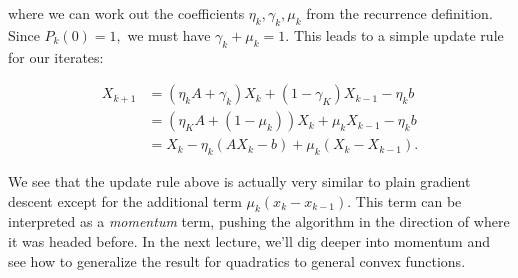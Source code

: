 where we can work out the coefficients $\eta_k,\gamma_k,\mu_k$ from the recurrence definition. Since $P_k(0)=1,$ we must have $\gamma_k+\mu_k=1.$ This leads to a simple update rule for our iterates:

\begin{eqnarray*}
X_{k+1} &= (\eta_k A + \gamma_k)X_k + (1 - \gamma_K)X_{k-1} - \eta_k b \\
&= (\eta_K A + (1 - \mu_k))X_k + \mu_k X_{k-1} - \eta_k b \\
&= X_k - \eta_k(AX_k - b) + \mu_k(X_k - X_{k-1}).
\end{eqnarray*}

We see that the update rule above is actually very similar to plain gradient descent except for the additional term  $\mu_k(x_k - x_{k-1}).$ This term can be interpreted as a \textit{momentum} term, pushing the algorithm in the direction of where it was headed before. In the next lecture, we'll dig deeper into momentum and see how to generalize the result for quadratics to general convex functions.

